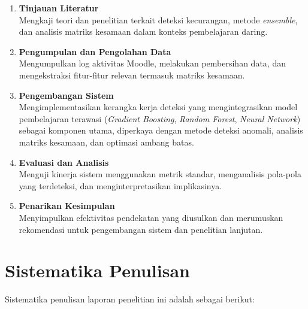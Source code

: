 \begin{enumerate}
\item \textbf{Tinjauan Literatur}\\
Mengkaji teori dan penelitian terkait deteksi kecurangan, metode \textit{ensemble}, dan analisis matriks kesamaan dalam konteks pembelajaran daring.

\item \textbf{Pengumpulan dan Pengolahan Data}\\
Mengumpulkan log aktivitas Moodle, melakukan pembersihan data, dan mengekstraksi fitur-fitur relevan termasuk matriks kesamaan.

\item \textbf{Pengembangan Sistem}\\
Mengimplementasikan kerangka kerja deteksi yang mengintegrasikan model pembelajaran terawasi (\textit{Gradient Boosting}, \textit{Random Forest}, \textit{Neural Network}) sebagai komponen utama, diperkaya dengan metode deteksi anomali, analisis matriks kesamaan, dan optimasi ambang batas.

\item \textbf{Evaluasi dan Analisis}\\
Menguji kinerja sistem menggunakan metrik standar, menganalisis pola-pola yang terdeteksi, dan menginterpretasikan implikasinya.

\item \textbf{Penarikan Kesimpulan}\\
Menyimpulkan efektivitas pendekatan yang diusulkan dan merumuskan rekomendasi untuk pengembangan sistem dan penelitian lanjutan.
\end{enumerate}

\section{Sistematika Penulisan}
\label{sec:sistematikaPenulisan}

Sistematika penulisan laporan penelitian ini adalah sebagai berikut:


